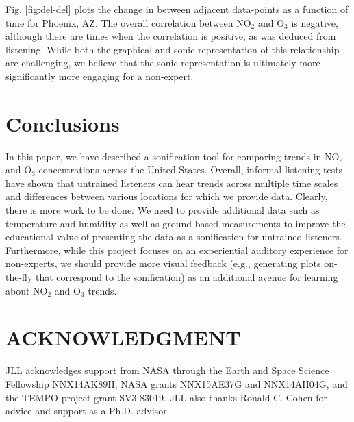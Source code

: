 \documentclass[a4paper,10pt,oneside]{article}
\newcommand{\ce}[1]{$\mathrm{#1}$}
\begin{document}
\begin{sloppy}
	Fig. \ref{fig:del-del} plots the change in  between adjacent data-points as a function of time for Phoenix, AZ. The overall correlation between \ce{NO_2} and \ce{O_3} is negative, although there are times when the correlation is positive, as was deduced from listening. While both the graphical and sonic representation of this relationship are challenging, we believe that the sonic representation is ultimately more significantly more engaging for a non-expert.

\section{Conclusions}
In this paper, we have described a sonification tool for comparing trends in \ce{NO_2} and \ce{O_3} concentrations across the United States.  Overall, informal listening tests have shown that untrained listeners can  hear trends across multiple time scales and differences between various locations for which we provide data.  Clearly, there is more work to be done. We need to provide additional data such as temperature and humidity as well as ground based measurements to improve the educational value of presenting the data as a sonification for untrained listeners.  Furthermore, while this project focuses on an experiential auditory experience for non-experts, we should provide more visual feedback (e.g., generating plots on-the-fly that correspond to the sonification) as an additional avenue for learning about \ce{NO_2} and \ce{O_3} trends.  


\section{ACKNOWLEDGMENT}
\label{sec:ack}

JLL acknowledges support from NASA through the Earth and Space Science Fellowship NNX14AK89H, NASA grants NNX15AE37G and NNX14AH04G, and the TEMPO project grant SV3-83019.  JLL also thanks Ronald C. Cohen for advice and support as a Ph.D. advisor.






\end{sloppy}
\end{document}
